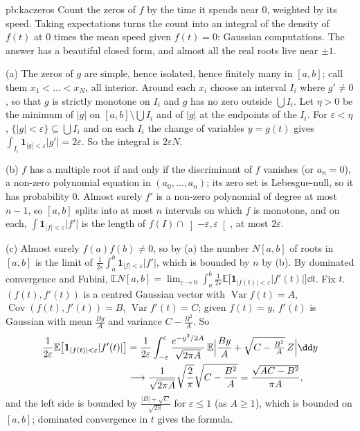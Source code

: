 \begin{solution}{pb:kaczeros}
\idea Count the zeros of $f$ by the time it spends near $0$, weighted by its speed. Taking expectations turns the count into an integral of the density of $f(t)$ at $0$
times the mean speed given $f(t)=0$: Gaussian computations. The answer has a beautiful closed form, and almost all the real roots live near $\pm1$.

\writeup (a) The zeros of $g$ are simple, hence isolated, hence finitely many in $[a,b]$; call them $x_1<\dots<x_N$, all interior. Around each $x_i$ choose an interval
$I_i$ where $g'\ne0$, so that $g$ is strictly monotone on $I_i$ and $g$ has no zero outside $\bigcup I_i$. Let $\eta>0$ be the minimum of $|g|$ on $[a,b]\setminus\bigcup I_i$ and
of $|g|$ at the endpoints of the $I_i$. For $\varepsilon<\eta$, $\{|g|<\varepsilon\}\subseteq\bigcup I_i$ and on each $I_i$ the change of variables $y=g(t)$ gives
$\int_{I_i}\mathbf 1_{|g|<\varepsilon}|g'|=2\varepsilon$. So the integral is $2\varepsilon N$.

(b) $f$ has a multiple root if and only if the discriminant of $f$ vanishes (or $a_n=0$), a non-zero polynomial equation in $(a_0,\dots,a_n)$; its zero set is Lebesgue-null, so it
has probability $0$. Almost surely $f'$ is a non-zero polynomial of degree at most $n-1$, so $[a,b]$ splits into at most $n$ intervals on which $f$ is monotone, and on each,
$\int\mathbf 1_{|f|<\varepsilon}|f'|$ is the length of $f(I)\cap\left]-\varepsilon,\varepsilon\right[$, at most $2\varepsilon$.

(c) Almost surely $f(a)f(b)\ne0$, so by (a) the number $N[a,b]$ of roots in $[a,b]$ is the limit of $\frac1{2\varepsilon}\int_a^b\mathbf 1_{|f|<\varepsilon}|f'|$, which is bounded by $n$ by
(b). By dominated convergence and Fubini,
$\mathbb EN[a,b]=\lim_{\varepsilon\to0}\int_a^b\frac1{2\varepsilon}\mathbb E\bigl[\mathbf 1_{|f(t)|<\varepsilon}|f'(t)|\bigr]\dd t$. Fix $t$. $(f(t),f'(t))$ is a centred Gaussian vector with
$\operatorname{Var}f(t)=A$, $\operatorname{Cov}(f(t),f'(t))=B$, $\operatorname{Var}f'(t)=C$; given $f(t)=y$, $f'(t)$ is Gaussian with mean $\frac{By}A$ and variance $C-\frac{B^2}A$. So
\[
\begin{aligned}
\frac1{2\varepsilon}\mathbb E\bigl[\mathbf 1_{|f(t)|<\varepsilon}|f'(t)|\bigr]&=\frac1{2\varepsilon}\int_{-\varepsilon}^\varepsilon\frac{e^{-y^2/2A}}{\sqrt{2\pi A}}\,\mathbb E\Bigl|\frac{By}A+\sqrt{C-\tfrac{B^2}A}\,Z\Bigr|\dd y\\
&\longrightarrow\frac1{\sqrt{2\pi A}}\sqrt{\frac2\pi}\sqrt{C-\frac{B^2}A}=\frac{\sqrt{AC-B^2}}{\pi A},
\end{aligned}
\]
and the left side is bounded by $\frac{|B|+\sqrt C}{\sqrt{2\pi}}$ for $\varepsilon\le1$ (as $A\ge1$), which is bounded on $[a,b]$; dominated convergence in $t$ gives the formula.


\end{solution}
